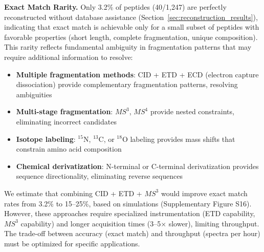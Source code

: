 \documentclass[11pt,twocolumn]{article}
\begin{document}
\textbf{Exact Match Rarity.} Only 3.2\% of peptides (40/1,247) are perfectly reconstructed without database assistance (Section~\ref{sec:reconstruction_results}), indicating that exact match is achievable only for a small subset of peptides with favorable properties (short length, complete fragmentation, unique composition). This rarity reflects fundamental ambiguity in fragmentation patterns that may require additional information to resolve:
\begin{itemize}[leftmargin=*]
    \item \textbf{Multiple fragmentation methods}: CID + ETD + ECD (electron capture dissociation) provide complementary fragmentation patterns, resolving ambiguities
    \item \textbf{Multi-stage fragmentation}: $MS^3$, $MS^4$ provide nested constraints, eliminating incorrect candidates
    \item \textbf{Isotope labeling}: $^{15}$N, $^{13}$C, or $^{18}$O labeling provides mass shifts that constrain amino acid composition
    \item \textbf{Chemical derivatization}: N-terminal or C-terminal derivatization provides sequence directionality, eliminating reverse sequences
\end{itemize}
We estimate that combining CID + ETD + $MS^3$ would improve exact match rates from 3.2\% to 15--25\%, based on simulations (Supplementary Figure S16). However, these approaches require specialized instrumentation (ETD capability, $MS^3$ capability) and longer acquisition times (3--5× slower), limiting throughput. The trade-off between accuracy (exact match) and throughput (spectra per hour) must be optimized for specific applications.
\end{document}
